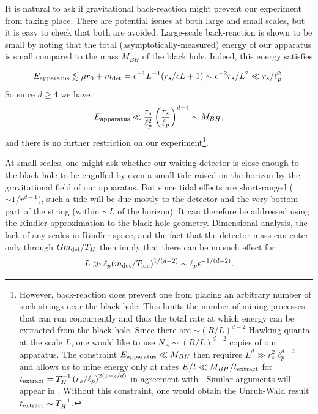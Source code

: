 \documentclass[12pt]{article}
\begin{document}
It is natural to ask if gravitational back-reaction might prevent our experiment from taking place.  There are potential issues at both large and small scales, but it is easy to check that both are avoided.
Large-scale back-reaction is shown to be small by noting that the total (asymptotically-measured) energy of our apparatus is small compared to the mass $M_{BH}$ of the black hole.  Indeed, this energy satisfies

\begin{equation}
E_{\rm apparatus} \lesssim
 \mu r_0 + m_{\rm det}  = \epsilon^{-1} L^{-1} (r_s/\epsilon L +1) \sim \epsilon^{-2} r_s/L^2 \ll r_s/\ell_p^2.
\end{equation}
So since $d \ge 4$ we have
\begin{equation}
E_{\rm  apparatus} \ll   \frac{r_s}{\ell_p^2 } \left(\frac{r_s}{\ell_p} \right)^{d-4} \sim M_{BH},
\end{equation}
and there is no further restriction on our experiment\footnote{\label{lim} However, back-reaction does prevent one from placing an arbitrary number of such strings near the black hole.  This limits the number of mining processes that can run concurrently and thus the total rate at which energy can be extracted from the black hole.  Since there are $\sim (R/L)^{d-2}$  Hawking quanta at the scale $L$, one would like to use $N_A \sim (R/L)^{d-2}$ copies of our apparatus.  The constraint $E_{\rm apparatus} \ll M_{BH}$ then requires $L^d \gg r_s^2 \ell_p^{d-2}$ and
allows us to mine energy only at rates
$E/t \ll M_{BH}/t_{\rm extract}$ for $t_{\rm extract} = T_H^{-1} \left( {r_s}/{\ell_p} \right)^{2(1-2/d)}$  in agreement with \cite{FF}.  Similar arguments will appear in \cite{AB}. Without this constraint, one would obtain the Unruh-Wald result $t_{\rm extract} \sim T_H^{-1}$.}.

At small scales, one might ask whether our waiting detector is close enough to the black hole to be engulfed by even a small tide raised on the horizon by the gravitational field of our apparatus.  But since tidal effects are short-ranged ($\sim 1/r^{d-1}$), such a tide will be due mostly to the detector and the very bottom part of the string (within $\sim L$ of the horizon).  It can therefore be addressed using the Rindler approximation to the black hole geometry.  Dimensional analysis, the lack of any scales in Rindler space,  and the fact that the detector mass can enter only through $Gm_{\rm det}/T_H$ then imply that there can be no such effect for
\begin{equation}
\label{tide}
L \gg \ell_p (m_{\rm det}/T_{\rm loc})^{1/(d-2)} \sim \ell_p \epsilon^{-1/(d-2)} .
\end{equation}
\end{document}
